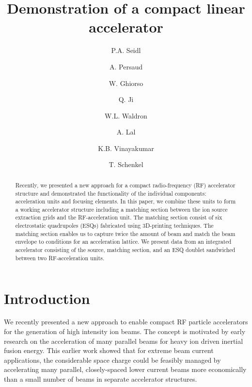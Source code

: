 \documentclass[%
 aip,
rsi,%
 amsmath,amssymb,
 reprint,%
]{revtex4-1}
\begin{document}
\title[]{Demonstration of a compact linear accelerator}
\author{P.A. Seidl}
\author{A. Persaud}
\author{W. Ghiorso}
\author{Q. Ji}
\author{W.L. Waldron}
%

\author{A. Lal}
\author{K.B. Vinayakumar}
%
\author{T. Schenkel}
%

\begin{abstract}
Recently, we presented a new approach for a compact radio-frequency (RF) accelerator structure and demonstrated the functionality of the individual components: acceleration units and focusing elements. In this paper, we combine these units to form a working accelerator structure including a matching section between the ion source extraction grids and the RF-acceleration unit. The matching section consist of six electrostatic quadrupoles (ESQs) fabricated using 3D-printing techniques. The matching section enables us to capture twice the amount of beam and match the beam envelope to conditions for an acceleration lattice. We present data from an integrated accelerator consisting of the source, matching section, and an ESQ doublet sandwiched between two RF-acceleration units.
\end{abstract}


\maketitle
% 
% 
% 
% 
\section{Introduction}
We recently presented a new approach to enable compact RF particle accelerators for the generation of high intensity ion beams.  The concept is motivated by early research on the acceleration of many parallel beams for heavy ion driven inertial fusion energy.  This earlier work showed that for extreme beam current applications, the considerable space charge could be feasibly managed by accelerating many parallel, closely-spaced lower current beams more economically than a small number of beams in separate accelerator structures. 
\end{document}

